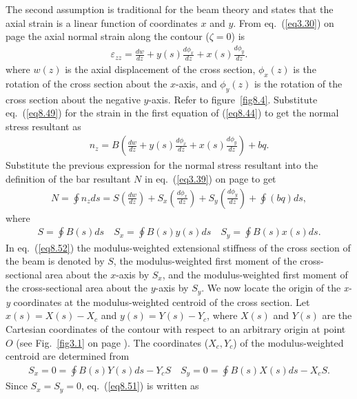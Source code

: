\documentclass{AeroStructure-ERJohnson}
\begin{document}
The second assumption is traditional for the beam theory and
states that the axial strain is a linear function of coordinates
$x$ and $y$. From eq.~(\ref{eq3.30}) on page \pageref{eq3.30} the axial normal
strain along the contour ($\zeta=0$) is
\begin{align}\label{eq8.49}
\varepsilon_{z z}=\frac{d w}{d z}+y(s) \frac{d \phi_{x}}{d z}+x(s)
\frac{d \phi_{y}}{d z}.
\end{align}
where $w(z)$ is the axial displacement of the cross section,
$\phi_{x}(z)$ is the rotation of the cross section about the
$x$-axis, and $\phi_{y}(z)$ is the rotation of the cross section
about the negative $y$-axis. Refer to figure~\ref{fig8.4}.
Substitute eq.~(\ref{eq8.49}) for the strain in the first equation
of (\ref{eq8.44}) to get the normal stress resultant as
\begin{align}\label{eq8.50}
n_{z}=B\left(\frac{d w}{d z}+y(s) \frac{d \phi_{x}}{d z}+x(s)
\frac{d \phi_{y}}{d z}\right)+b q.
\end{align}
Substitute the previous expression for the normal stress resultant
into the definition of the bar resultant $N$ in eq.~(\ref{eq3.39})
on page \pageref{eq3.39} to get
\begin{align}\label{eq8.51}
N=\oint n_{z} d s=S\left(\frac{d w}{d z}\right)+S_{x}\left(\frac{d
\phi_{x}}{d z}\right)+S_{y}\left(\frac{d \phi_{y}}{d
z}\right)+\oint(b q) d s,
\end{align}
where
\begin{align}\label{eq8.52}
S=\oint B(s) d s \quad S_{x}=\oint B(s) y(s) d s \quad S_{y}=\oint
B(s) x(s) d s.
\end{align}
In eq.~(\ref{eq8.52}) the modulus-weighted extensional stiffness
of the cross section of the beam is denoted by $S$, the
modulus-weighted first moment of the cross-sectional area about
the $x$-axis by $S_{x}$, and the modulus-weighted first moment of
the cross-sectional area about the $y$-axis by $S_{y}$. We now
locate the origin of the \textit{x-y} coordinates at the
modulus-weighted centroid of the cross section. Let
$x(s)=X(s)-X_{c}$ and $y(s)=Y(s)-Y_{c}$, where $X(s)$ and $Y(s)$
are the Cartesian coordinates of the contour with respect to an
arbitrary origin at point $O$ (see Fig.~\ref{fig3.1} on page
\pageref{fig3.1}). The coordinates ($X_c,Y_c$) of the
modulus-weighted centroid are determined from
\begin{align}\label{eq8.53}
S_{x}=0=\oint B(s) Y(s) d s-Y_{c} S \quad S_{y}=0=\oint B(s) X(s)
d s-X_{c} S.
\end{align}
Since $S_{x}=S_{y}=0$, eq.~(\ref{eq8.51}) is written as
\end{document}
